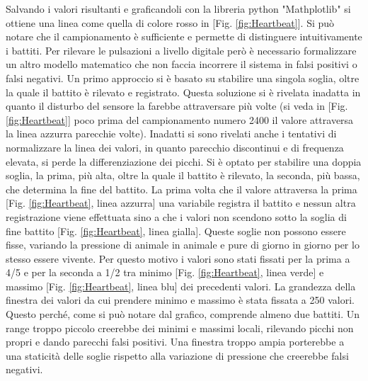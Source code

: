 Salvando i valori risultanti e graficandoli con la libreria python "Mathplotlib" si ottiene una linea come quella di colore rosso in [Fig. \ref{fig:Heartbeat}]. Si può notare che il campionamento è sufficiente e permette di distinguere intuitivamente i battiti. 
Per rilevare le pulsazioni a livello digitale però è necessario formalizzare un altro modello matematico che non faccia incorrere il sistema in falsi positivi o falsi negativi. Un primo approccio si è basato su stabilire una singola soglia, oltre la quale il battito è rilevato e registrato. Questa soluzione si è rivelata inadatta in quanto il disturbo del sensore la farebbe attraversare più volte (si veda in [Fig. \ref{fig:Heartbeat}] poco prima del campionamento numero 2400 il valore attraversa la linea azzurra parecchie volte). Inadatti si sono rivelati anche i tentativi di normalizzare la linea dei valori, in quanto parecchio discontinui e di frequenza elevata, si perde la differenziazione dei picchi. Si è optato per stabilire una doppia soglia, la prima, più alta, oltre la quale il battito è rilevato, la seconda, più bassa, che determina la fine del battito. La prima volta che il valore attraversa la prima [Fig. \ref{fig:Heartbeat}, linea azzurra] una variabile registra il battito e nessun altra registrazione viene effettuata sino a che i valori non scendono sotto la soglia di fine battito [Fig. \ref{fig:Heartbeat}, linea gialla]. 
Queste soglie non possono essere fisse, variando la pressione di animale in animale e pure di giorno in giorno per lo stesso essere vivente. Per questo motivo i valori sono stati fissati per la prima a 4/5 e per la seconda a 1/2 tra minimo [Fig. \ref{fig:Heartbeat}, linea verde] e massimo [Fig. \ref{fig:Heartbeat}, linea blu] dei precedenti valori. La grandezza della finestra dei valori da cui prendere minimo  e massimo è stata fissata a 250 valori. Questo perché, come si può notare dal grafico, comprende almeno due battiti. Un range troppo piccolo creerebbe dei minimi e massimi locali, rilevando picchi non propri e dando parecchi falsi positivi. Una finestra troppo ampia porterebbe a una staticità delle soglie rispetto alla variazione di pressione che creerebbe falsi negativi.  

